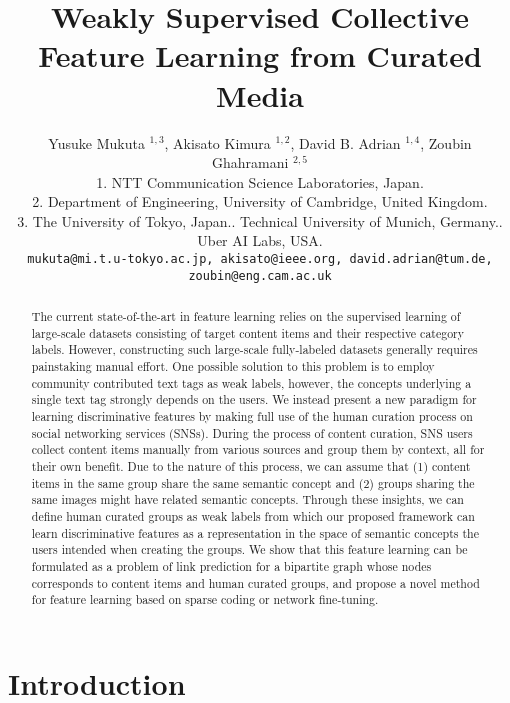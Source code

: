 \documentclass[letterpaper]{article} %
\begin{document}
\title{Weakly Supervised Collective Feature Learning from Curated Media}
\author{%
  Yusuke Mukuta $^{1,3}$, Akisato Kimura $^{1,2}$, David B. Adrian $^{1,4}$, Zoubin Ghahramani $^{2,5}$\\
  1. NTT Communication Science Laboratories, Japan.\\
  2. Department of Engineering, University of Cambridge, United Kingdom.\\
  3. The University of Tokyo, Japan.. Technical University of Munich, Germany.. Uber AI Labs, USA.\\
  {\tt\small mukuta@mi.t.u-tokyo.ac.jp, akisato@ieee.org, david.adrian@tum.de, zoubin@eng.cam.ac.uk}
}

\maketitle

\begin{abstract}
The current state-of-the-art in feature learning relies on the supervised learning of large-scale datasets consisting of target content items and their respective category labels.
However, constructing such large-scale fully-labeled datasets generally requires painstaking manual effort.
One possible solution to this problem is to employ community contributed text tags as weak labels, however, the concepts underlying a single text tag strongly depends on the users.
We instead present a new paradigm for learning discriminative features by making full use of the human curation process on social networking services (SNSs).
During the process of content curation, SNS users collect content items manually from various sources and group them by context, all for their own benefit.
Due to the nature of this process, we can assume that (1) content items in the same group share the same semantic concept and (2) groups sharing the same images might have related semantic concepts.
Through these insights, we can define human curated groups as weak labels from which our proposed framework can learn discriminative features as a representation in the space of semantic concepts the users intended when creating the groups.
We show that this feature learning can be formulated as a problem of link prediction for a bipartite graph whose nodes corresponds to content items and human curated groups, and propose a novel method for feature learning based on sparse coding or network fine-tuning.
\end{abstract}


\section{Introduction}
\label{sec:intro}
\end{document}
